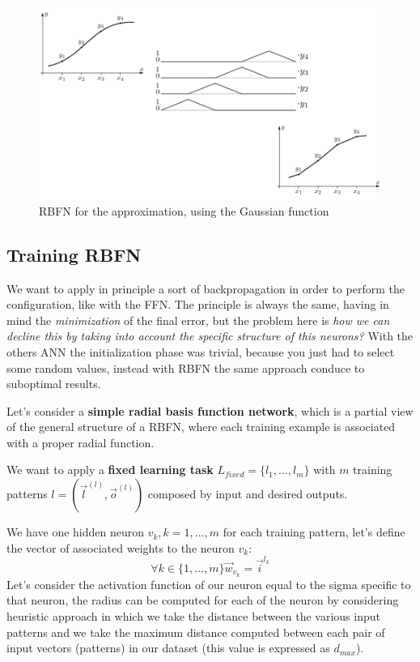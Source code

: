 \documentclass{article}
\begin{document}
\begin{figure}[H]
    \centering
    \includegraphics[scale=0.4]{images/gaussian_rbfn.png}
    \caption{RBFN for the approximation, using the Gaussian function}
\end{figure}

\subsection{Training RBFN}
We want to apply in principle a sort of backpropagation in order to perform the configuration,
like with the FFN.
The principle is always the same, having in mind the \textit{minimization} of the final error,
but the problem here is \textit{how we can decline this by taking into account the
    specific structure of this neurons?}
With the others ANN the initialization phase was trivial, because you just had to
select some random values, instead with RBFN the same approach conduce to suboptimal
results.

Let's consider a \textbf{simple radial basis function network}, which is
a partial view of the general structure of a RBFN, where each training example is associated
with a proper radial function.

We want to apply a \textbf{fixed learning task} $L_{fixed} = \{l_1,...,l_m\}$ with
$m$ training patterns $l=(\vec{l}^{(l)},\vec{o}^{(l)})$ composed by input and desired outputs.

We have one hidden neuron $v_k, k=1,...,m$ for each training pattern, let's define the vector
of associated weights to the neuron $v_k$:
$$\forall k\in\{1,...,m\}\vec{w}_{v_k}=\vec{i}^{l_k}$$
Let's consider the activation function of our neuron equal to the sigma specific to that
neuron, the radius can be computed for each of the neuron by considering heuristic approach
in which we take the distance between the various input patterns and we take the maximum
distance computed between each pair of input vectors (patterns) in our dataset (this value
is expressed as $d_{max}$).
\end{document}

